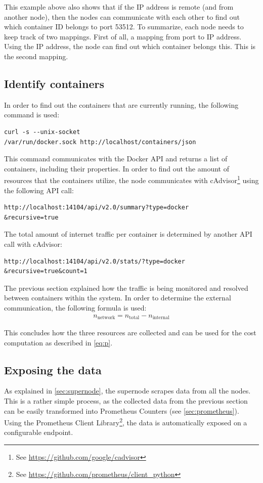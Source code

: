 \noindent
This example above also shows that if the IP address is remote (and from another node), then the nodes can communicate with each other to find out which container ID belongs to port 53512.
To summarize, each node needs to keep track of two mappings. First of all, a mapping from port to IP address. Using the IP address, the node can find out which container belongs this. This is the second mapping.

\subsection{Identify containers}
In order to find out the containers that are currently running, the following command is used:
\begin{verbatim}
curl -s --unix-socket 
/var/run/docker.sock http://localhost/containers/json
\end{verbatim}

\noindent
This command communicates with the Docker API and returns a list of containers, including their properties. In order to find out the amount of resources that the containers utilize, the node communicates with cAdvisor\footnote{See \url{https://github.com/google/cadvisor}} using the following API call:
\begin{verbatim}
http://localhost:14104/api/v2.0/summary?type=docker
&recursive=true
\end{verbatim}

\noindent
The total amount of internet traffic per container is determined by another API call with cAdvisor:
\begin{verbatim}
http://localhost:14104/api/v2.0/stats/?type=docker
&recursive=true&count=1
\end{verbatim}

\noindent
The previous section explained how the traffic is being monitored and resolved between containers within the system. In order to determine the external communication, the following formula is used:
\begin{align} \label{formula:traffic}
n_\text{network} = n_\text{total} - n_\text{internal}
\end{align}

\noindent
This concludes how the three resources are collected and can be used for the cost computation as described in \autoref{eq:p}.

\subsection{Exposing the data} \label{sec:exposing_data}
As explained in \autoref{sec:supernode}, the supernode scrapes data from all the nodes. This is a rather simple process, as the collected data from the previous section can be easily transformed into Prometheus Counters (see \autoref{sec:prometheus}). Using the Prometheus Client Library\footnote{See \url{https://github.com/prometheus/client_python}}, the data is automatically exposed on a configurable endpoint.\\

